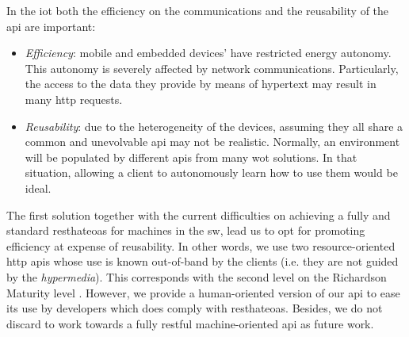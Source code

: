 
In the \ac{iot} both the efficiency on the communications and the reusability of the \ac{api} are important:
\begin{itemize}
  \item \emph{Efficiency}: mobile and embedded devices' have restricted energy autonomy.
                    This autonomy is severely affected by network communications. %
                    Particularly, the access to the data they provide by means of hypertext may result in many \ac{http} requests. %
  \item \emph{Reusability}: due to the heterogeneity of the devices, assuming they all share a common and unevolvable \ac{api} may not be realistic.
			    Normally, an environment will be populated by different \acp{api} from many \ac{wot} solutions.
			    In that situation, allowing a client to autonomously learn how to use them would be ideal.
\end{itemize}
The first solution together with the current difficulties on achieving a fully and standard \ac{resthateoas} for machines in the \ac{sw}, lead us to opt for promoting efficiency at expense of reusability.
In other words, we use two resource-oriented \ac{http} \acp{api} whose use is known out-of-band by the clients (i.e. they are not guided by the \emph{hypermedia}). %
This corresponds with the second level on the Richardson Maturity level \cite{fowler_richardson_2010}. %
However, we provide a human-oriented version of our \ac{api} to ease its use by developers which does comply with \ac{resthateoas}.%
Besides, we do not discard to work towards a fully \ac{rest}ful machine-oriented \ac{api} as future work.


